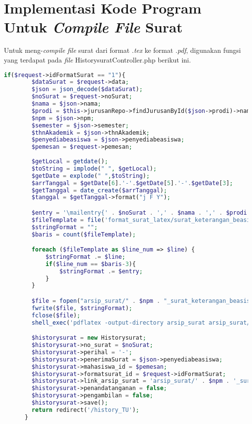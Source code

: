 \section{Implementasi Kode Program Untuk \textit{Compile File} Surat}
\label{sec:implementasi_kode_program_untuk_compile_file_surat}
Untuk meng-\textit{compile} \textit{file} surat dari format \textit{.tex} ke format \textit{.pdf}, digunakan fungsi yang terdapat pada \textit{file} HistorysuratController.php berikut ini.
\begin{lstlisting}[language=php, basicstyle=\tiny, caption=Fungsi untuk meng-\textit{compile} surat]
	if($request->idFormatSurat == "1"){
        $dataSurat = $request->data;
        $json = json_decode($dataSurat);
        $noSurat = $request->noSurat;
        $nama = $json->nama;
        $prodi = $this->jurusanRepo->findJurusanById($json->prodi)->nama_jurusan;
        $npm = $json->npm;
        $semester = $json->semester;
        $thnAkademik = $json->thnAkademik;
        $penyediabeasiswa = $json->penyediabeasiswa;
        $pemesan = $request->pemesan;
        
        $getLocal = getdate();
        $toString = implode(" ", $getLocal);
        $getDate = explode(" ",$toString);
        $arrTanggal = $getDate[6].'-'.$getDate[5].'-'.$getDate[3];
        $getTanggal = date_create($arrTanggal);
        $tanggal = $getTanggal->format("j F Y");

        $entry = '\mailentry{' . $noSurat . ',' . $nama . ',' . $prodi . ',' . $npm . ',' . $semester . ',' . $thnAkademik . ',' . $penyediabeasiswa . ',' . $tanggal . '}';
        $fileTemplate = file('format_surat_latex/surat_keterangan_beasiswa.tex');
        $stringFormat = "";
        $baris = count($fileTemplate);

        foreach ($fileTemplate as $line_num => $line) {
            $stringFormat .= $line;
            if($line_num == $baris-3){
                $stringFormat .= $entry;
            }
        }

        $file = fopen("arsip_surat/" . $npm . "_surat_keterangan_beasiswa.tex", "w");
        fwrite($file, $stringFormat);
        fclose($file);
        shell_exec('pdflatex -output-directory arsip_surat arsip_surat/' . $npm . '_surat_keterangan_beasiswa.tex');

        $historysurat = new Historysurat;
        $historysurat->no_surat = $noSurat;
        $historysurat->perihal = '-';
        $historysurat->penerimaSurat = $json->penyediabeasiswa;
        $historysurat->mahasiswa_id = $pemesan;
        $historysurat->formatsurat_id = $request->idFormatSurat;
        $historysurat->link_arsip_surat = 'arsip_surat/' . $npm . '_surat_keterangan_beasiswa.pdf';
        $historysurat->penandatanganan = false;
        $historysurat->pengambilan = false;
        $historysurat->save();
        return redirect('/history_TU');
      }
\end{lstlisting}


